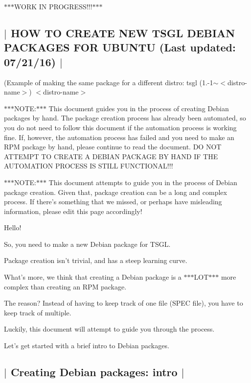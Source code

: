 $\ast$$\ast$$\ast$\-W\-O\-R\-K I\-N P\-R\-O\-G\-R\-E\-S\-S!!!$\ast$$\ast$$\ast$ 

 \subsection*{$\vert$ H\-O\-W T\-O C\-R\-E\-A\-T\-E N\-E\-W T\-S\-G\-L D\-E\-B\-I\-A\-N P\-A\-C\-K\-A\-G\-E\-S F\-O\-R U\-B\-U\-N\-T\-U (Last updated\-: 07/21/16) $\vert$ }

(Example of making the same package for a different distro\-: tsgl (1.-\/1$\sim$$<$distro-\/name$>$) $<$distro-\/name$>$

$\ast$$\ast$$\ast$\-N\-O\-T\-E\-:$\ast$$\ast$$\ast$ This document guides you in the process of creating Debian packages by hand. The package creation process has already been automated, so you do not need to follow this document if the automation process is working fine. If, however, the automation process has failed and you need to make an R\-P\-M package by hand, please continue to read the document. D\-O N\-O\-T A\-T\-T\-E\-M\-P\-T T\-O C\-R\-E\-A\-T\-E A D\-E\-B\-I\-A\-N P\-A\-C\-K\-A\-G\-E B\-Y H\-A\-N\-D I\-F T\-H\-E A\-U\-T\-O\-M\-A\-T\-I\-O\-N P\-R\-O\-C\-E\-S\-S I\-S S\-T\-I\-L\-L F\-U\-N\-C\-T\-I\-O\-N\-A\-L!!!

$\ast$$\ast$$\ast$\-N\-O\-T\-E\-:$\ast$$\ast$$\ast$ This document attempts to guide you in the process of Debian package creation. Given that, package creation can be a long and complex process. If there's something that we missed, or perhaps have misleading information, please edit this page accordingly!

Hello!

So, you need to make a new Debian package for T\-S\-G\-L.

Package creation isn't trivial, and has a steep learning curve.

What's more, we think that creating a Debian package is a $\ast$$\ast$$\ast$\-L\-O\-T$\ast$$\ast$$\ast$ more complex than creating an R\-P\-M package.

The reason? Instead of having to keep track of one file (S\-P\-E\-C file), you have to keep track of multiple.

Luckily, this document will attempt to guide you through the process.

Let's get started with a brief intro to Debian packages. 

 \subsection*{$\vert$ Creating Debian packages\-: intro $\vert$ }

